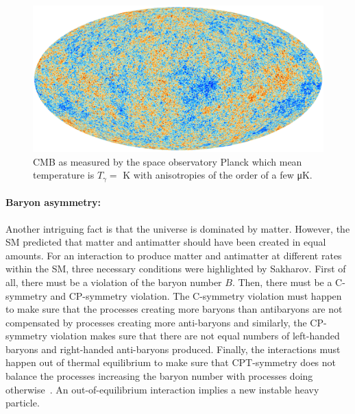 	\begin{figure}[H]
		\centering
		\includegraphics[width=\plotwidth]{fig/chapt2/CMB.jpg}
		\caption{\label{fig:CMB} \acl{CMB} as measured by the space observatory Planck which mean temperature is $T_\gamma =$ \si{K} with anisotropies of the order of a few \si{\micro K}.}
	\end{figure}
	 
	\paragraph*{Baryon asymmetry: }
	
	Another intriguing fact is that the universe is dominated by matter. However, the SM predicted that matter and antimatter should have been created in equal amounts. For an interaction to produce matter and antimatter at different rates within the SM, three necessary conditions were highlighted by Sakharov\cite{SAKHAROV1967}. First of all, there must be a violation of the baryon number $B$. Then, there must be a C-symmetry and CP-symmetry violation. The C-symmetry violation must happen to make sure that the processes creating more baryons than antibaryons are not compensated by processes creating more anti-baryons and similarly, the CP-symmetry violation makes sure that there are not equal numbers of left-handed baryons and right-handed anti-baryons produced. Finally, the interactions must happen out of thermal equilibrium to make sure that CPT-symmetry does not balance the processes increasing the baryon number with processes doing otherwise~\cite{SHAPOSHNIKOV1993}. An out-of-equilibrium interaction implies a new instable heavy particle.
	
